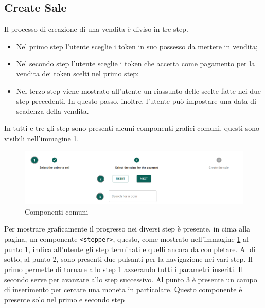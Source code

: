 \documentclass[a4paper]{article}
\begin{document}
        \subsection{Create Sale}
        Il processo di creazione di una vendita è diviso in tre step.
        \begin{itemize}
          \item Nel primo step l'utente sceglie i token in suo possesso da mettere in vendita;
          \item Nel secondo step l'utente sceglie i token che accetta come pagamento per la vendita dei token scelti nel primo step;
          \item Nel terzo step viene mostrato all'utente un riassunto delle scelte fatte nei due step precedenti. In questo passo, inoltre, l'utente può
                impostare una data di scadenza della vendita.
        \end{itemize}
        In tutti e tre gli step sono presenti alcuni componenti grafici comuni, questi sono visibili nell'immagine \ref{fig:commonComponents}.
        \begin{figure}[H]
          \includegraphics[width=\textwidth]{commonComponents.png}
          \caption{Componenti comuni}
          \centering
          \label{fig:commonComponents}
        \end{figure}
        Per mostrare graficamente il progresso nei diversi step è presente, in cima alla pagina, un componente
        \verb|<stepper>|, questo, come mostrato nell'immagine \ref{fig:commonComponents} al punto 1, indica all'utente gli step terminati e quelli ancora da completare.
        \newline
        Al di sotto, al punto 2, sono presenti due pulsanti per la navigazione nei vari step. Il primo permette di tornare allo step 1 azzerando tutti i parametri inseriti.
        Il secondo serve per avanzare allo step successivo.
        \newline
        Al punto 3 è presente un campo di inserimento per cercare una moneta in particolare. Questo componente è presente solo nel primo e secondo step
\end{document}
